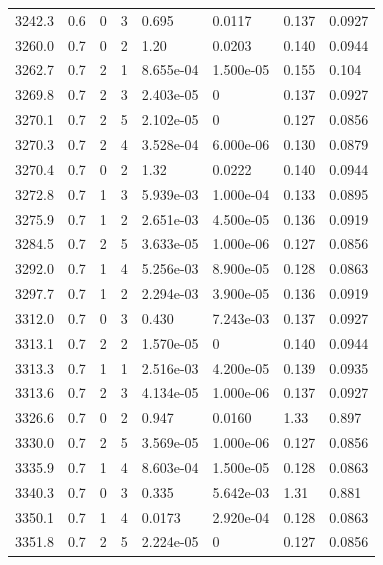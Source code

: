 \documentclass[preview]{standalone}
\begin{document}
{{{{{{{{{{{{{\begin{tabular}{L{1.2cm}C{1.2cm} C{0.3cm}C{0.5cm} C{1.4cm}C{1.4cm} C{1.4cm}C{1.4cm}}
  3242.3  &   0.6  & 0     &  3 &  0.695  & 0.0117  & 0.137 &  0.0927   \\ 
  3260.0  &   0.7  & 0     &  2 &  1.20  & 0.0203  & 0.140 &  0.0944   \\ 
  3262.7  &   0.7  & 2     &  1 &  8.655e-04  & 1.500e-05  & 0.155 &  0.104   \\ 
  3269.8  &   0.7  & 2     &  3 &  2.403e-05  & 0  & 0.137 &  0.0927   \\ 
  3270.1  &   0.7  & 2     &  5 &  2.102e-05  & 0  & 0.127 &  0.0856   \\ 
  3270.3  &   0.7  & 2     &  4 &  3.528e-04  & 6.000e-06  & 0.130 &  0.0879   \\ 
  3270.4  &   0.7  & 0     &  2 &  1.32  & 0.0222  & 0.140 &  0.0944   \\ 
  3272.8  &   0.7  & 1     &  3 &  5.939e-03  & 1.000e-04  & 0.133 &  0.0895   \\ 
  3275.9  &   0.7  & 1     &  2 &  2.651e-03  & 4.500e-05  & 0.136 &  0.0919   \\ 
  3284.5  &   0.7  & 2     &  5 &  3.633e-05  & 1.000e-06  & 0.127 &  0.0856   \\ 
  3292.0  &   0.7  & 1     &  4 &  5.256e-03  & 8.900e-05  & 0.128 &  0.0863   \\ 
  3297.7  &   0.7  & 1     &  2 &  2.294e-03  & 3.900e-05  & 0.136 &  0.0919   \\ 
  3312.0  &   0.7  & 0     &  3 &  0.430  & 7.243e-03  & 0.137 &  0.0927   \\ 
  3313.1  &   0.7  & 2     &  2 &  1.570e-05  & 0  & 0.140 &  0.0944   \\ 
  3313.3  &   0.7  & 1     &  1 &  2.516e-03  & 4.200e-05  & 0.139 &  0.0935   \\ 
  3313.6  &   0.7  & 2     &  3 &  4.134e-05  & 1.000e-06  & 0.137 &  0.0927   \\ 
  3326.6  &   0.7  & 0     &  2 &  0.947  & 0.0160  & 1.33 &  0.897   \\ 
  3330.0  &   0.7  & 2     &  5 &  3.569e-05  & 1.000e-06  & 0.127 &  0.0856   \\ 
  3335.9  &   0.7  & 1     &  4 &  8.603e-04  & 1.500e-05  & 0.128 &  0.0863   \\ 
  3340.3  &   0.7  & 0     &  3 &  0.335  & 5.642e-03  & 1.31 &  0.881   \\ 
  3350.1  &   0.7  & 1     &  4 &  0.0173  & 2.920e-04  & 0.128 &  0.0863   \\ 
  3351.8  &   0.7  & 2     &  5 &  2.224e-05  & 0  & 0.127 &  0.0856   \\ 

\end{tabular}}}}}}}}}}}}}}
\end{document}

